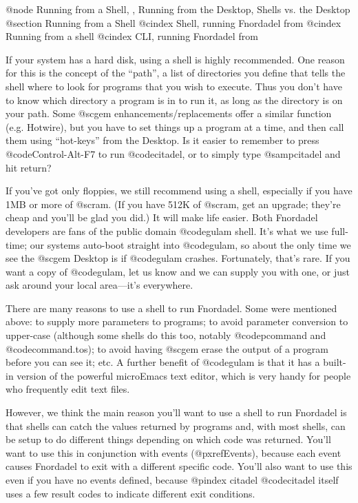 @node Running from a Shell,  , Running from the Desktop, Shells vs. the Desktop
@section Running from a Shell
@cindex Shell, running Fnordadel from
@cindex Running from a shell
@cindex CLI, running Fnordadel from

If your system has a hard disk, using a shell is highly recommended.
One reason for this is the concept of the ``path'', a list of
directories you define that
tells the shell where to look for programs that you wish to execute.  Thus
you don't have to know which directory a program is in to run it, as long
as the directory is on your path.  Some @sc{gem} enhancements/replacements offer
a similar function (e.g. Hotwire), but you have to set things up a program at
a time, and then call them using ``hot-keys'' from the Desktop.  Is
it easier to
remember to press @code{Control-Alt-F7} to run
@code{citadel}, or to simply type @samp{citadel}
and hit return?

If you've got only floppies, we still recommend using a shell,
especially if you have 1MB or more of @sc{ram}.  (If you have 512K of @sc{ram}, get an
upgrade; they're cheap and you'll be glad you did.)  It will make life
easier.  Both Fnordadel developers are fans of the public domain @code{gulam}
shell.  It's what we use full-time; our systems auto-boot straight into
@code{gulam}, so about the only time we see the @sc{gem} Desktop is if
@code{gulam} crashes.
Fortunately, that's rare.  If you want a copy of @code{gulam}, let us
know and we can supply you with one, or just ask around your local area---it's
everywhere.

There are many reasons to use a shell to run Fnordadel.
Some were mentioned above:  to supply more parameters to programs;
to avoid parameter conversion to upper-case (although some shells
do this too, notably @code{pcommand} and @code{command.tos}); to avoid
having @sc{gem}
erase the output of a program before you can see it; etc.  A further
benefit of @code{gulam} is that it has a built-in version of
the powerful microEmacs
text editor, which is very handy for people who frequently edit
text files.

However, we think the main reason you'll want to use a shell
to run Fnordadel is that shells can catch the values returned by
programs and, with most shells, can be setup to do different things
depending on which code was returned.  You'll want to use this in
conjunction with events (@pxref{Events}), because each event causes
Fnordadel to exit with a different specific code.  You'll also
want to use this even if you have no events defined, because
@pindex citadel
@code{citadel} itself uses a few result codes to indicate different
exit conditions.

